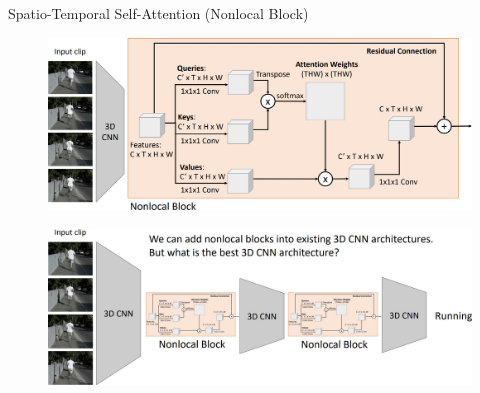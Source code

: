 \begin{frame}[allowframebreaks]{Spatio-Temporal Self-Attention (Nonlocal Block)}
    \begin{figure}
        \centering
        \includegraphics[width=1\textwidth,height=0.9\textheight,keepaspectratio]{images/video/slide_33_1_img.jpg}
    \end{figure}
\framebreak
    \begin{figure}
        \centering
        \includegraphics[width=1\textwidth,height=0.9\textheight,keepaspectratio]{images/video/slide_34_1_img.jpg}
    \end{figure}
\end{frame}